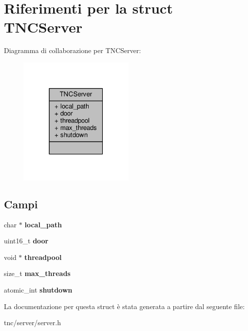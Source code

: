 \hypertarget{struct__TNCServer}{}\section{Riferimenti per la struct T\+N\+C\+Server}
\label{struct__TNCServer}


Diagramma di collaborazione per T\+N\+C\+Server\+:\nopagebreak
\begin{figure}[H]
\begin{center}
\leavevmode
\includegraphics[width=162pt]{struct__TNCServer__coll__graph}
\end{center}
\end{figure}
\subsection*{Campi}
\begin{DoxyCompactItemize}
\item 
\hypertarget{struct__TNCServer_a54021e55484bbab986ee6dcf4a041d89}{}char $\ast$ {\bfseries local\+\_\+path}\label{struct__TNCServer_a54021e55484bbab986ee6dcf4a041d89}

\item 
\hypertarget{struct__TNCServer_a77baf2fea9fbe7f74070da27f0308ffe}{}uint16\+\_\+t {\bfseries door}\label{struct__TNCServer_a77baf2fea9fbe7f74070da27f0308ffe}

\item 
\hypertarget{struct__TNCServer_a4839ef9ebf71c1ee1f682948b43f94c0}{}void $\ast$ {\bfseries threadpool}\label{struct__TNCServer_a4839ef9ebf71c1ee1f682948b43f94c0}

\item 
\hypertarget{struct__TNCServer_a2f71267d5b838ec61e49d115cd15283d}{}size\+\_\+t {\bfseries max\+\_\+threads}\label{struct__TNCServer_a2f71267d5b838ec61e49d115cd15283d}

\item 
\hypertarget{struct__TNCServer_a42f7928a23024127424791c1467f9144}{}atomic\+\_\+int {\bfseries shutdown}\label{struct__TNCServer_a42f7928a23024127424791c1467f9144}

\end{DoxyCompactItemize}


La documentazione per questa struct è stata generata a partire dal seguente file\+:\begin{DoxyCompactItemize}
\item 
tnc/server/server.\+h\end{DoxyCompactItemize}
